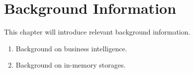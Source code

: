 \chapter{Background Information}
\label{chap:background}
This chapter will introduce relevant background information.
\begin{enumerate}
  \item Background on business intelligence.
  \item Background on in-memory storages.
\end{enumerate}
\clearpage



